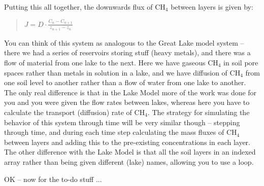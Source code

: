 \documentclass{tufte-book} %
\newenvironment{docspec}{\begin{quotation}\ttfamily\parskip0pt\parindent0pt\ignorespaces}{\end{quotation}}
\begin{document}
Putting this all together, the downwards flux of CH\(_{4}\) between layers is given by:
\begin{docspec}
\(J = D\cdot\frac{C_{n} - C_{n+1}}{z_{n+1} - z_{n}}\)
\end{docspec}

You can think of this system as analogous to the Great Lake model system -- there we had a series of reservoirs storing stuff (heavy metals), and there was a flow of material from one lake to the next. Here we have gaseous CH\(_{4}\) in soil pore spaces rather than metals in solution in a lake, and we have diffusion of CH\(_{4}\) from one soil level to another rather than a flow of water from one lake to another. The only real difference is that in the Lake Model more of the work was done for you and you were given the flow rates between lakes, whereas here you have to calculate the transport (diffusion) rate of CH\(_{4}\). The strategy for simulating the behavior of this system through time will be very similar though -- stepping through time, and during each time step calculating the mass fluxes of CH\(_{4}\) between layers and adding this to the pre-existing concentrations in each layer. The other difference with the Lake Model is that all the soil layers in an indexed array rather than being given different (lake) names, allowing you to use a loop.

OK -- now for the to-do stuff ...
\end{document}
